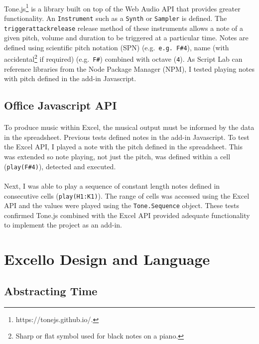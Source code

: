 \paragraph{} Tone.js\footnote{https://tonejs.github.io/.} is a library built on top of the Web Audio API that provides greater functionality. An \texttt{Instrument} such as a \texttt{Synth} or \texttt{Sampler} is defined. The \texttt{triggerattackrelease} release method of these instruments allows a note of a given pitch, volume and duration to be triggered at a particular time. Notes are defined using scientific pitch notation (SPN) (e.g.~\texttt{e.g.~F\#4}), name (with accidental\footnote{Sharp or flat symbol used for black notes on a piano.} if required) (e.g.~\texttt{F\#}) combined with octave (\texttt{4}). As Script Lab can reference libraries from the Node Package Manager (NPM), I tested playing notes with pitch defined in the add-in Javascript.

\subsection{Office Javascript API}

\paragraph{} To produce music within Excel, the musical output must be informed by the data in the spreadsheet. Previous tests defined notes in the add-in Javascript. To test the Excel API, I played a note with the pitch defined in the spreadsheet. This was extended so note playing, not just the pitch, was defined within a cell (\texttt{play(F\#4)}), detected and executed.

\paragraph{} Next, I was able to play a sequence of constant length notes defined in consecutive cells (\texttt{play(H1:K1)}). The range of cells was accessed using the Excel API and the values were played using the \texttt{Tone.Sequence} object. These tests confirmed Tone.js combined with the Excel API provided adequate functionality to implement the project as an add-in.

\section{Excello Design and Language}

\subsection{Abstracting Time}

